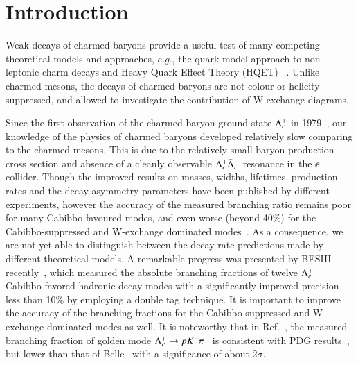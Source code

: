 \section{Introduction}

Weak decays of charmed baryons provide a useful test of many competing theoretical models and approaches,
$e.g.$, the quark model approach to non-leptonic charm decays and Heavy Quark Effect Theory (HQET)
~\cite{1998YKohara, 1998Mikhail, 1997KKSharma, 1994TUppal, 1994PZenczykowsky, 1992JGKorner, 1979JGKorner}.
Unlike charmed mesons, the decays of charmed baryons are not colour or helicity suppressed, and
allowed to investigate the contribution of W-exchange diagrams.

Since the first observation of the charmed baryon ground state $\Lambda_{c}^{+}$ in 1979~\cite{1980GSAbrams,1979AMCnops},
our knowledge of the physics of charmed baryons developed relatively slow comparing to the charmed mesons.
This is due to the relatively small baryon production cross section and absence of a cleanly observable
$\Lambda_{c}^{+}\bar{\Lambda}_{c}^{-}$ resonance in the $\ee$ collider.
Though the improved results on masses, widths, lifetimes, production rates and the decay asymmetry
parameters have been published by different experiments, however the accuracy of the measured branching
ratio remains poor for many Cabibbo-favoured modes, and even worse (beyond 40\%) for the  Cabibbo-suppressed
and W-exchange dominated modes~\cite{2014PDG}.
As a consequence, we are not yet able to distinguish between the decay rate predictions made by different
theoretical models.
A remarkable progress was presented by BESIII recently~\cite{2015MAblikimLambdac}, which measured the absolute
branching fractions of twelve $\Lambda_{c}^{+}$ Cabibbo-favored hadronic decay modes with a significantly improved
precision less than 10\% by employing a double tag technique.
It is important to improve the accuracy of the branching fractions for the Cabibbo-suppressed and W-exchange
dominated modes as well.
It is noteworthy that in Ref.~\cite{2015MAblikimLambdac}, the measured branching fraction of golden mode
$\Lambda_{c}^{+}\rightarrow pK^{-}\pi^{+}$ is consistent with PDG results~\cite{2014PDG}, but lower than that of Belle~\cite{2014AZupanc}
with a significance of about 2$\sigma$.


